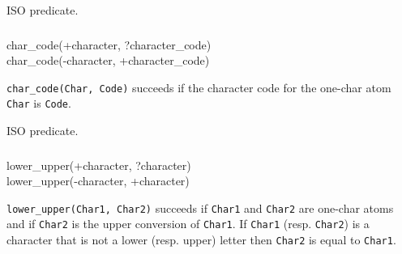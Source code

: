ISO predicate.

\subsubsection{\label{char-code/2}}

\begin{TemplatesOneCol}
char\_code(+character, ?character\_code)\\
char\_code(-character, +character\_code)

\end{TemplatesOneCol}

\Description

\texttt{char\_code(Char, Code)} succeeds if the character code for the
one-char atom \texttt{Char} is \texttt{Code}.

\begin{PlErrors}





\end{PlErrors}

\Portability

ISO predicate.

\subsubsection{}

\begin{TemplatesOneCol}
lower\_upper(+character, ?character)\\
lower\_upper(-character, +character)

\end{TemplatesOneCol}

\Description

\texttt{lower\_upper(Char1, Char2)} succeeds if \texttt{Char1} and
\texttt{Char2} are one-char atoms and if \texttt{Char2} is the upper
conversion of \texttt{Char1}. If \texttt{Char1} (resp. \texttt{Char2}) is a
character that is not a lower (resp. upper) letter then \texttt{Char2} is
equal to \texttt{Char1}.

